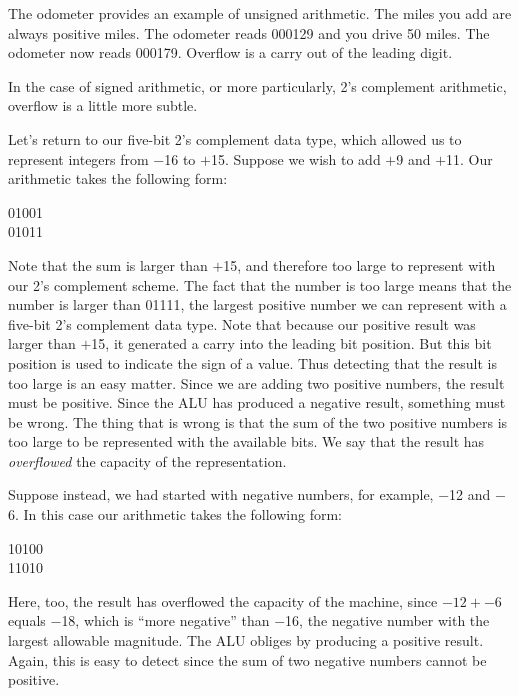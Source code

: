 \documentclass{patt}
\begin{document}
The odometer provides an example of unsigned arithmetic.  The miles
you add are always positive miles.  The odometer reads 000129 and you
drive 50 miles.  The odometer now reads 000179.  Overflow is a
carry out of the leading digit.

In the case of signed arithmetic, or more particularly, 2's complement
arithmetic, overflow is a little more subtle.

Let's return to our five-bit 2's complement data type, which allowed
us to represent integers from $-$16 to $+$15.  Suppose we wish to add
$+$9 and $+$11.  Our arithmetic takes the following form:

\begin{cctable}
01001\\
01011\\
\end{cctable}

\noindent
Note that the sum is larger than $+$15, and therefore too large to
represent with our 2's complement scheme.  The fact that the number is
too large means that the number is larger than 01111, the largest
positive number we can represent with a five-bit 2's complement data
type.  Note that because our positive result was larger than $+$15, it
generated a carry into the leading bit position.  But this bit
position is used to indicate the sign of a value.  Thus detecting that
the result is too large is an easy matter.  Since we are adding two
positive numbers, the result must be positive.  Since the ALU has
produced a negative result, something must be wrong.  The thing that
is wrong is that the sum of the two positive numbers is too large to
be represented with the available bits.  We say that the result has
\textit{overflowed} the capacity of the representation.

Suppose instead, we had started with negative numbers, for example,
$-$12 and $-$6. In this case our arithmetic takes the following form:

\begin{cctable}
10100\\
11010\\
\end{cctable}

\enlargethispage{-2\baselineskip}

\noindent
Here, too, the result has overflowed the capacity of the machine,
since $-12+-6$ equals $-$18, which is ``more negative'' than $-$16,
the negative number with the largest allowable magnitude.  The ALU
obliges by producing a positive result.  Again, this is easy to detect
since the sum of two negative numbers cannot be positive.
\end{document}
